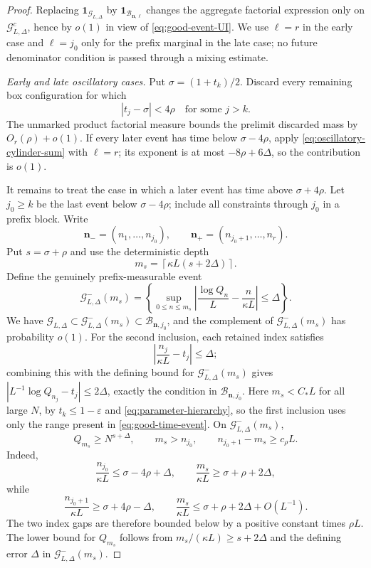 \documentclass[11pt]{article}
\numberwithin{equation}{section}
\theoremstyle{definition}
\newcommand{\1}{\mathbf 1}
\begin{document}
\begin{proof}
Replacing \(\1_{\mathcal G_{L,\Delta}}\) by
\(\1_{\mathcal B_{\mathbf n,\ell}}\) changes the aggregate factorial
expression only on \(\mathcal G_{L,\Delta}^c\), hence by \(o(1)\) in
view of \eqref{eq:good-event-UI}.  We use \(\ell=r\) in the early case
and \(\ell=j_0\) only for the prefix marginal in the late case; no
future denominator condition is passed through a mixing estimate.

\medskip
\noindent\emph{Early and late oscillatory cases.}
Put \(\sigma=(1+t_k)/2\).  Discard every remaining box configuration
for which
\[
 |t_j-\sigma|<4\rho\quad\text{for some }j>k.
\]
The unmarked product factorial measure bounds the prelimit discarded
mass by \(O_r(\rho)+o(1)\).  If every later event has time below
\(\sigma-4\rho\), apply
\eqref{eq:oscillatory-cylinder-sum} with \(\ell=r\); its exponent is
at most \(-8\rho+6\Delta\), so the contribution is \(o(1)\).

It remains to treat the case in which a later event has time above
\(\sigma+4\rho\).  Let \(j_0\ge k\) be the last event below
\(\sigma-4\rho\); include all constraints through \(j_0\) in a prefix
block.  Write
\[
 \mathbf n_-=(n_1,\ldots,n_{j_0}),\qquad
 \mathbf n_+=(n_{j_0+1},\ldots,n_r).
\]
Put \(s=\sigma+\rho\) and use the deterministic depth
\begin{equation}\label{eq:deterministic-depth}
 m_s=\left\lceil\kappa L(s+2\Delta)\right\rceil.
\end{equation}
Define the genuinely prefix-measurable event
\begin{equation}\label{eq:prefix-good-event}
 \mathcal G^-_{L,\Delta}(m_s)=
 \left\{
  \sup_{0\le n\le m_s}
  \left|\frac{\log Q_n}{L}-\frac{n}{\kappa L}\right|
  \le\Delta
 \right\}.
\end{equation}
We have
\(\mathcal G_{L,\Delta}\subset
  \mathcal G^-_{L,\Delta}(m_s)\subset
  \mathcal B_{\mathbf n,j_0}\), and the complement of
\(\mathcal G^-_{L,\Delta}(m_s)\) has probability \(o(1)\).
For the second inclusion, each retained index satisfies
\[
 \left|\frac{n_j}{\kappa L}-t_j\right|\le\Delta;
\]
combining this with the defining bound for
\(\mathcal G^-_{L,\Delta}(m_s)\) gives
\(|L^{-1}\log Q_{n_j}-t_j|\le2\Delta\), exactly the condition in
\(\mathcal B_{\mathbf n,j_0}\).
Here \(m_s<C_*L\) for all large \(N\), by
\(t_k\le1-\varepsilon\) and \eqref{eq:parameter-hierarchy}, so the first
inclusion uses only the range present in \eqref{eq:good-time-event}.
On \(\mathcal G^-_{L,\Delta}(m_s)\),
\[
 Q_{m_s}\ge N^{s+\Delta},\qquad
 m_s>n_{j_0},\qquad
 n_{j_0+1}-m_s\ge c_\rho L.
\]
Indeed,
\[
 \frac{n_{j_0}}{\kappa L}
 \le\sigma-4\rho+\Delta,\qquad
 \frac{m_s}{\kappa L}\ge\sigma+\rho+2\Delta,
\]
while
\[
 \frac{n_{j_0+1}}{\kappa L}
 \ge\sigma+4\rho-\Delta,\qquad
 \frac{m_s}{\kappa L}
 \le\sigma+\rho+2\Delta+O(L^{-1}).
\]
The two index gaps are therefore bounded below by a positive constant
times \(\rho L\).  The lower bound for \(Q_{m_s}\) follows from
\(m_s/(\kappa L)\ge s+2\Delta\) and the defining error \(\Delta\) in
\(\mathcal G^-_{L,\Delta}(m_s)\).


\end{proof}
\end{document}
